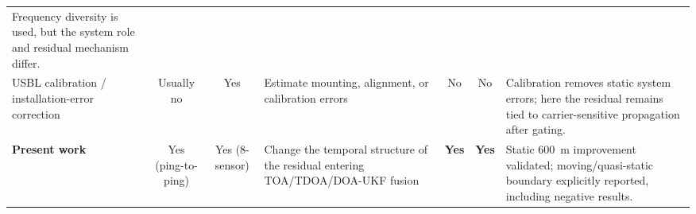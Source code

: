 \documentclass[journal]{IEEEtran}
\begin{document}
\begin{table}[!t]
\begin{tabularx}{\textwidth}{L c c L c c L}
Frequency diversity is used, but the system role and residual mechanism differ. \\
USBL calibration / installation-error correction & Usually no & Yes & Estimate mounting,
alignment, or calibration errors & No & No & Calibration removes static system errors; here the
residual remains tied to carrier-sensitive propagation after gating. \\
\textbf{Present work} & Yes (ping-to-ping) & Yes (8-sensor) & Change the temporal structure of the
residual entering TOA/TDOA/DOA-UKF fusion & \textbf{Yes} & \textbf{Yes} & Static 600~m improvement
validated; moving/quasi-static boundary explicitly reported, including negative results. \\
\bottomrule
\end{tabularx}
\end{table}
\end{document}
